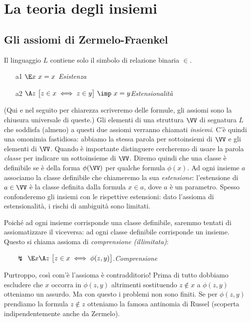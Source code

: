 \chapter{La teoria degli insiemi}\label{insiemi}


\section{Gli assiomi di Zermelo-Fraenkel}

Il linguaggio $L$ contiene solo il simbolo di relazione binaria $\in$. 

\begin{itemize}
\item[a1]$\E x\ x = x\phantom{\big]}$\hfill\emph{Esistenza}

\item[a2]$\A z\ \big[z\in x \iff z\in y\big]\ \imp\ x=y$\hfill \emph{Estensionalit\`a}
\end{itemize}

(Qui e nel seguito per chiarezza scriveremo delle formule, gli assiomi sono la chiusura universale di queste.) Gli elementi di una struttura $\VV$ di segnatura $L$ che soddisfa (almeno) a questi due assiomi verranno chiamati \emph{insiemi}. C'\`e quindi una omonimia fastidiosa: abbiamo la stessa parola per sottoinsiemi di $\VV$ e gli elementi di $\VV$. Quando \`e importante distinguere cercheremo di usare la parola \emph{classe\/} per indicare un sottoinsieme di $\VV$. Diremo quindi che una classe \`e definibile se \`e della forma $\phi(\VV)$ per qualche formula $\phi(x)$. Ad ogni insieme $a$ associamo la classe definibile che chiameremo la sua \emph{estensione}: l'estensione di $a\in \VV$ \`e la classe definita dalla formula $x\in a$, dove $a$ \`e un parametro.  Spesso confonderemo gli insiemi con le rispettive estensioni: dato l'assioma di estensionalit\`a, i rischi di ambiguit\`a sono limitati. 

Poich\'e ad ogni insieme corrisponde una classe definibile, saremmo tentati di assiomatizzare il viceversa: ad ogni classe definibile corrisponde un insieme. Questo si chiama assioma di \emph{comprensione (illimitata)}:

\begin{itemize}
\item[{\blue\Large$\lightning$}]$\E x \A z\ \big[ z\in x \iff \phi(z,y)\big]$.\hfill\emph{Comprensione} 
\end{itemize}

Purtroppo, cos\`i com'\`e l'assioma \`e contradditorio! Prima di tutto dobbiamo escludere che $x$ occorra in $\phi(z,y)$ altrimenti sostituendo $z\notin x$ a $\phi(z,y)$ otteniamo un assurdo. Ma con questo i problemi non sono finiti. Se per $\phi(z,y)$ prendiamo la formula $z\notin z$ otteniamo la famosa antinomia di Russel (scoperta indipendentemente anche da Zermelo). 


